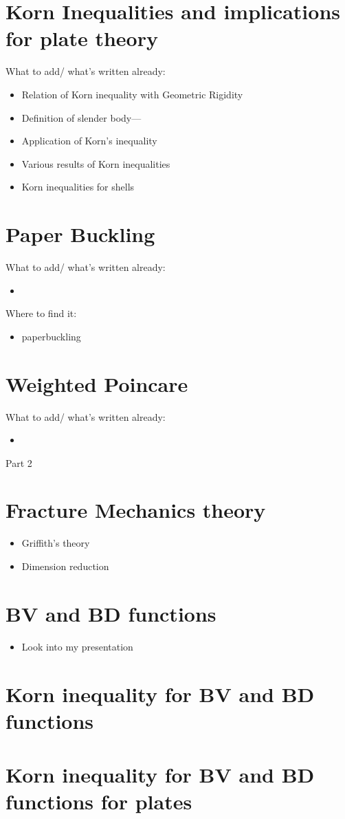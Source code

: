 \section{Korn Inequalities and implications for plate theory}
What to add/ what's written already:
\begin{itemize}
    \item Relation of Korn inequality with Geometric Rigidity
    \item Definition of slender body---
    \item Application of Korn's inequality
    \item Various results of Korn inequalities
    \item Korn inequalities for shells
\end{itemize}
\section{Paper Buckling}
What to add/ what's written already:
\begin{itemize}
    \item
\end{itemize}
Where to find it:
\begin{itemize}
    \item paperbuckling
\end{itemize}

\section{Weighted Poincare}
What to add/ what's written already:
\begin{itemize}
    \item   
\end{itemize}

Part 2
\section{Fracture Mechanics theory}
\begin{itemize}
    \item Griffith's theory
    \item Dimension reduction
\end{itemize}
\section{BV and BD functions}
\begin{itemize}
    \item Look into my presentation
\end{itemize}
\section{Korn  inequality for BV and BD functions}
\section{Korn inequality for BV and BD functions for plates}

